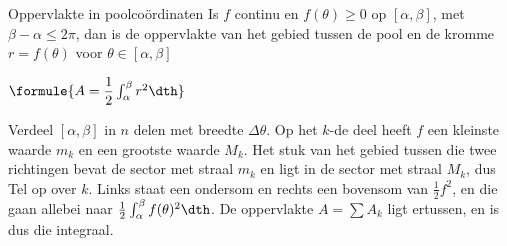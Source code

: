 \begin{theorie}
\begin{stelling}{Oppervlakte in poolcoördinaten}
Is $f$ continu en $f(\theta) \geqslant 0$ op $[\alpha, \beta]$, met $\beta - \alpha \leqslant 2\pi$, dan is de oppervlakte van het gebied tussen de pool en de kromme $r = f(\theta)$ voor $\theta \in [\alpha, \beta]$

\vspace{1mm}
\qquad $\formule{A = \dfrac12\int_\alpha^\beta r^2\dth}$
\end{stelling}

\begin{bewijs}
Verdeel $[\alpha, \beta]$ in $n$ delen met breedte $\Delta\theta$. Op het $k$-de deel heeft $f$ een kleinste waarde $m_k$ en een grootste waarde $M_k$. Het stuk van het gebied tussen die twee richtingen bevat de sector met straal $m_k$ en ligt in de sector met straal $M_k$, dus
Tel op over $k$. Links staat een ondersom en rechts een bovensom van $\tfrac12 f^2$, en die gaan allebei naar $\tfrac12\int_\alpha^\beta f(\theta)^2\dth$. De oppervlakte $A = \sum A_k$ ligt ertussen, en is dus die integraal.
\end{bewijs}
\end{theorie}


